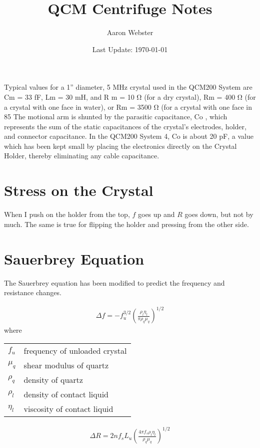 \documentclass[a4paper]{article}
\begin{document}
\title{QCM Centrifuge Notes}
\author{Aaron Webster}
\date{Last Update: \today}
\maketitle
\tableofcontents
\newpage

Typical values for a 1” diameter, 5 MHz crystal used in the QCM200 System are
Cm = 33 fF, Lm = 30 mH, and R m = 10 Ω (for a dry crystal), Rm = 400 Ω (for a crystal
with one face in water), or Rm = 3500 Ω (for a crystal with one face in 85%
The motional arm is shunted by the parasitic capacitance, Co , which represents the sum
of the static capacitances of the crystal’s electrodes, holder, and connector capacitance. In
the QCM200 System 4, Co is about 20 pF, a value which has been kept small by placing
the electronics directly on the Crystal Holder, thereby eliminating any cable capacitance.


\section{Stress on the Crystal}
\cite{filler1988acceleration}


When I push on the holder from the top, $f$ goes up and $R$ goes down, but
not by much.  The same is true for flipping the holder and pressing from
the other side.

\section{Sauerbrey Equation}
The Sauerbrey equation has been modified to predict the frequency and
resistance changes.

\begin{align}
 \Delta f = -f_u^{3/2} \left(\frac{\rho_l \eta_l}{\pi \rho_q \mu_q}\right)^{1/2}
\end{align}
where

\begin{tabular}{ll}
$f_u$     & frequency of unloaded crystal \\
$\mu_q$   & shear modulus of quartz \\
$\rho_q$  & density of quartz \\
$\rho_l$  & density of contact liquid \\
$\eta_l$   & viscosity of contact liquid
\end{tabular}

\begin{align}
 \Delta R = 2 n f_s L_u \left(\frac{4 \pi f_s \rho_l \eta_l}{\rho_q \mu_q}\right)^{1/2}
\end{align}
\end{document}
